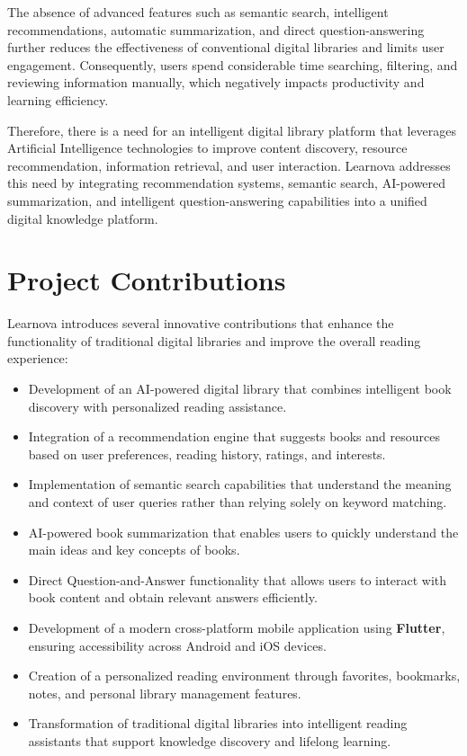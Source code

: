 The absence of advanced features such as semantic search, intelligent
recommendations, automatic summarization, and direct question-answering
further reduces the effectiveness of conventional digital libraries and limits
user engagement. Consequently, users spend considerable time searching,
filtering, and reviewing information manually, which negatively impacts
productivity and learning efficiency.

Therefore, there is a need for an intelligent digital library platform that
leverages Artificial Intelligence technologies to improve content discovery,
resource recommendation, information retrieval, and user interaction. Learnova
addresses this need by integrating recommendation systems, semantic search,
AI-powered summarization, and intelligent question-answering capabilities into
a unified digital knowledge platform.

\section{Project Contributions}
\label{sec:contributions}

Learnova introduces several innovative contributions that enhance the
functionality of traditional digital libraries and improve the overall reading
experience:

\begin{itemize}
  \item Development of an AI-powered digital library that combines intelligent
        book discovery with personalized reading assistance.
  \item Integration of a recommendation engine that suggests books and
        resources based on user preferences, reading history, ratings, and
        interests.
  \item Implementation of semantic search capabilities that understand the
        meaning and context of user queries rather than relying solely on
        keyword matching.
  \item AI-powered book summarization that enables users to quickly understand
        the main ideas and key concepts of books.
  \item Direct Question-and-Answer functionality that allows users to interact
        with book content and obtain relevant answers efficiently.
  \item Development of a modern cross-platform mobile application using
        \textbf{Flutter}, ensuring accessibility across Android and iOS devices.
  \item Creation of a personalized reading environment through favorites,
        bookmarks, notes, and personal library management features.
  \item Transformation of traditional digital libraries into intelligent
        reading assistants that support knowledge discovery and lifelong
        learning.
\end{itemize}

